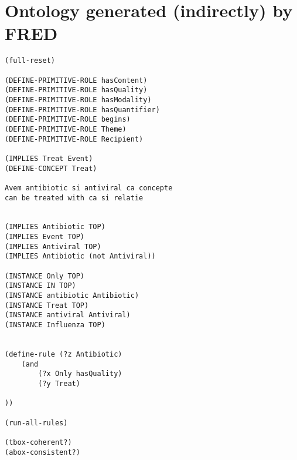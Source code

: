 \documentclass[a4paper,12pt]{report}
\begin{document}
\section{Ontology generated (indirectly) by FRED}
\lstset{style=mystyle}
\begin{lstlisting}
(full-reset)

(DEFINE-PRIMITIVE-ROLE hasContent) 
(DEFINE-PRIMITIVE-ROLE hasQuality) 
(DEFINE-PRIMITIVE-ROLE hasModality) 
(DEFINE-PRIMITIVE-ROLE hasQuantifier) 
(DEFINE-PRIMITIVE-ROLE begins) 
(DEFINE-PRIMITIVE-ROLE Theme) 
(DEFINE-PRIMITIVE-ROLE Recipient) 

(IMPLIES Treat Event) 
(DEFINE-CONCEPT Treat) 

Avem antibiotic si antiviral ca concepte
can be treated with ca si relatie


(IMPLIES Antibiotic TOP) 
(IMPLIES Event TOP) 
(IMPLIES Antiviral TOP) 
(IMPLIES Antibiotic (not Antiviral))

(INSTANCE Only TOP) 
(INSTANCE IN TOP) 
(INSTANCE antibiotic Antibiotic) 
(INSTANCE Treat TOP) 
(INSTANCE antiviral Antiviral) 
(INSTANCE Influenza TOP) 


(define-rule (?z Antibiotic)
	(and
		(?x Only hasQuality)
		(?y Treat)
		
))

(run-all-rules)

(tbox-coherent?)
(abox-consistent?)

\end{lstlisting}
\end{document}
